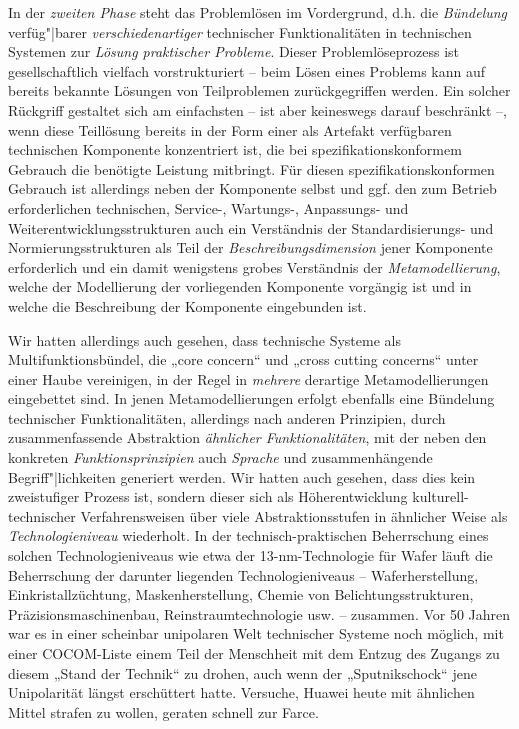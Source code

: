 \documentclass[12pt,a4paper]{article}
\begin{document}
In der \emph{zweiten Phase} steht das Problemlösen im Vordergrund, d.h. die
\emph{Bündelung} verfüg"|barer \emph{verschiedenartiger} technischer
Funktionalitäten in technischen Systemen zur \emph{Lösung praktischer
  Probleme}.  Dieser Problemlöseprozess ist gesellschaftlich vielfach
vorstrukturiert -- beim Lösen eines Problems kann auf bereits bekannte
Lösungen von Teilproblemen zurückgegriffen werden. Ein solcher Rückgriff
gestaltet sich am einfachsten -- ist aber keineswegs darauf beschränkt --,
wenn diese Teillösung bereits in der Form einer als Artefakt verfügbaren
technischen Komponente konzentriert ist, die bei spezifikationskonformem
Gebrauch die benötigte Leistung mitbringt.  Für diesen spezifikationskonformen
Gebrauch ist allerdings neben der Komponente selbst und ggf. den zum Betrieb
erforderlichen technischen, Service-, Wartungs-, Anpassungs- und
Weiterentwicklungsstrukturen auch ein Verständnis der Standardisierungs- und
Normierungsstrukturen als Teil der \emph{Beschreibungsdimension} jener
Komponente erforderlich und ein damit wenigstens grobes Verständnis der
\emph{Metamodellierung}, welche der Modellierung der vorliegenden Komponente
vorgängig ist und in welche die Beschreibung der Komponente eingebunden ist.

Wir hatten allerdings auch gesehen, dass technische Systeme als
Multifunktionsbündel, die „core concern“ und „cross cutting concerns“ unter
einer Haube vereinigen, in der Regel in \emph{mehrere} derartige
Metamodellierungen eingebettet sind. In jenen Metamodellierungen erfolgt
ebenfalls eine Bündelung technischer Funktionalitäten, allerdings nach anderen
Prinzipien, durch zusammenfassende Abstraktion \emph{ähnlicher
  Funktionalitäten}, mit der neben den konkreten \emph{Funktionsprinzipien}
auch \emph{Sprache} und zusammenhängende Begriff"|lichkeiten generiert werden.
Wir hatten auch gesehen, dass dies kein zweistufiger Prozess ist, sondern
dieser sich als Höherentwicklung kulturell-technischer Verfahrensweisen über
viele Abstraktionsstufen in ähnlicher Weise als \emph{Technologieniveau}
wiederholt. In der technisch-praktischen Beherrschung eines solchen
Technologieniveaus wie etwa der 13-nm-Technologie für Wafer läuft die
Beherrschung der darunter liegenden Technologieniveaus -- Waferherstellung,
Einkristallzüchtung, Maskenherstellung, Chemie von Belichtungsstrukturen,
Präzisionsmaschinenbau, Reinstraumtechnologie usw. -- zusammen. Vor 50 Jahren
war es in einer scheinbar unipolaren Welt technischer Systeme noch möglich,
mit einer COCOM-Liste einem Teil der Menschheit mit dem Entzug des Zugangs zu
diesem „Stand der Technik“ zu drohen, auch wenn der „Sputnikschock“ jene
Unipolarität längst erschüttert hatte.  Versuche, Huawei heute mit ähnlichen
Mittel strafen zu wollen, geraten schnell zur Farce.
\end{document}
